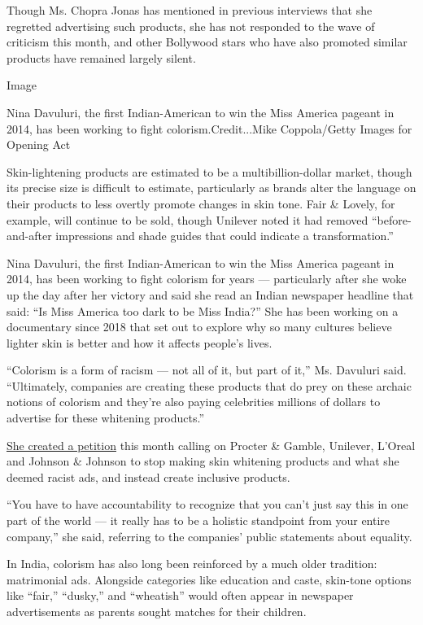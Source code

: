 Though Ms. Chopra Jonas has mentioned in previous interviews that she
regretted advertising such products, she has not responded to the wave
of criticism this month, and other Bollywood stars who have also
promoted similar products have remained largely silent.

Image

Nina Davuluri, the first Indian-American to win the Miss America pageant
in 2014, has been working to fight colorism.Credit...Mike Coppola/Getty
Images for Opening Act

Skin-lightening products are estimated to be a multibillion-dollar
market, though its precise size is difficult to estimate, particularly
as brands alter the language on their products to less overtly promote
changes in skin tone. Fair \& Lovely, for example, will continue to be
sold, though Unilever noted it had removed ``before-and-after
impressions and shade guides that could indicate a transformation.''

Nina Davuluri, the first Indian-American to win the Miss America pageant
in 2014, has been working to fight colorism for years --- particularly
after she woke up the day after her victory and said she read an Indian
newspaper headline that said: ``Is Miss America too dark to be Miss
India?'' She has been working on a documentary since 2018 that set out
to explore why so many cultures believe lighter skin is better and how
it affects people's lives.

``Colorism is a form of racism --- not all of it, but part of it,'' Ms.
Davuluri said. ``Ultimately, companies are creating these products that
do prey on these archaic notions of colorism and they're also paying
celebrities millions of dollars to advertise for these whitening
products.''

\href{https://www.change.org/p/end-colorism-stop-the-production-of-skin-whitening-products-toxic-messaging?utm_source=share_petition\&utm_medium=custom_url\&recruited_by_id=f6b0b9d0-a7f3-11ea-9da3-0162547e0ce4}{She
created a petition} this month calling on Procter \& Gamble, Unilever,
L'Oreal and Johnson \& Johnson to stop making skin whitening products
and what she deemed racist ads, and instead create inclusive products.

``You have to have accountability to recognize that you can't just say
this in one part of the world --- it really has to be a holistic
standpoint from your entire company,'' she said, referring to the
companies' public statements about equality.

In India, colorism has also long been reinforced by a much older
tradition: matrimonial ads. Alongside categories like education and
caste, skin-tone options like ``fair,'' ``dusky,'' and ``wheatish''
would often appear in newspaper advertisements as parents sought matches
for their children.

